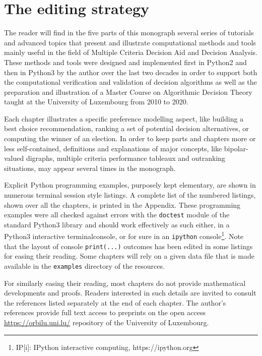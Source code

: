 \label{sec:0}

{}
\section*{The editing strategy}
\label{sec:0.1}

The reader will find in the five parts of this monograph several series of tutorials and advanced topics that present and illustrate computational methods and tools mainly useful in the field of Multiple Criteria Decision Aid and Decision Analysis. These methods and tools were designed and implemented first in Python2 and then in Python3 by the author over the last two decades in order to support both the computational verification and validation of decision algorithms as well as the preparation and illustration of a Master Course on Algorithmic Decision Theory taught at the University of Luxembourg from 2010 to 2020.

Each chapter illustrates a specific preference modelling aspect, like building a best choice recommendation, ranking a set of potential decision alternatives, or computing the winner of an election. In order to keep parts and chapters more or less self-contained, definitions and explanations of major concepts, like bipolar-valued digraphs, multiple criteria performance tableaux and outranking situations, may appear several times in the monograph.

Explicit Python programming examples, purposely kept elementary, are shown in numerous terminal session style listings. A complete list of the numbered listings, shown over all the chapters, is printed in the Appendix. These programming examples were all checked against errors with the \texttt{doctest} module of the standard Python3 library and should work effectively as such either, in a Python3 interactive terminalconsole, or for sure in an \texttt{ipython} console\footnote{IP[i]: IPython interactive computing, https://ipython.org}. Note that the layout of console \texttt{print(...)} outcomes has been edited in some listings for easing their reading. Some chapters will rely on a given data file that is made available in the \texttt{examples} directory of the \Digraph resources. 

For similarly easing their reading, most chapters do not provide mathematical developments and proofs. Readers interested in such details are invited to consult the references listed separately at the end of each chapter. The author's references provide full text access to preprints on the open access \href{https://orbilu.uni.lu/}{https://orbilu.uni.lu/} repository of the University of Luxembourg.

